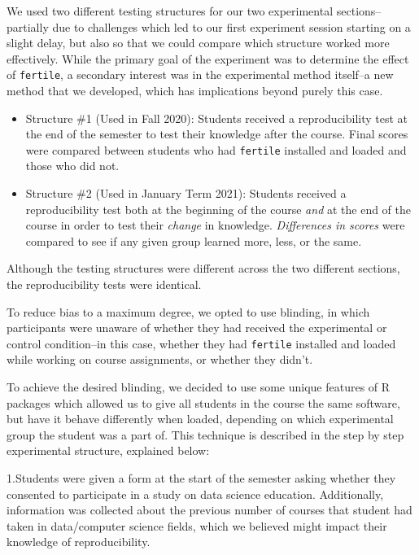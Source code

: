 \documentclass[12pt,twoside]{reedthesis}
\begin{document}
We used two different testing structures for our two experimental sections--partially due to challenges which led to our first experiment session starting on a slight delay, but also so that we could compare which structure worked more effectively. While the primary goal of the experiment was to determine the effect of \texttt{fertile}, a secondary interest was in the experimental method itself--a new method that we developed, which has implications beyond purely this case.
\begin{itemize}
\item
  Structure \#1 (Used in Fall 2020): Students received a reproducibility test at the end of the semester to test their knowledge after the course. Final scores were compared between students who had \texttt{fertile} installed and loaded and those who did not.
\item
  Structure \#2 (Used in January Term 2021): Students received a reproducibility test both at the beginning of the course \emph{and} at the end of the course in order to test their \emph{change} in knowledge. \emph{Differences in scores} were compared to see if any given group learned more, less, or the same.
\end{itemize}
Although the testing structures were different across the two different sections, the reproducibility tests were identical.

To reduce bias to a maximum degree, we opted to use blinding, in which participants were unaware of whether they had received the experimental or control condition--in this case, whether they had \texttt{fertile} installed and loaded while working on course assignments, or whether they didn't.

To achieve the desired blinding, we decided to use some unique features of R packages which allowed us to give all students in the course the same software, but have it behave differently when loaded, depending on which experimental group the student was a part of.
This technique is described in the step by step experimental structure, explained below:

1.Students were given a form at the start of the semester asking whether they consented to participate in a study on data science education. Additionally, information was collected about the previous number of courses that student had taken in data/computer science fields, which we believed might impact their knowledge of reproducibility.
\end{document}
